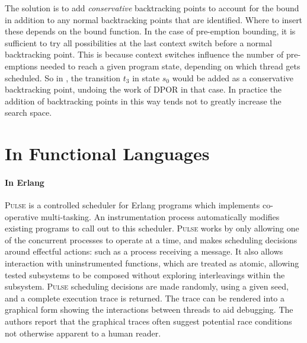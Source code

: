 The solution is to add \emph{conservative} backtracking points to
account for the bound in addition to any normal backtracking points
that are identified.  Where to insert these depends on the bound
function.  In the case of pre-emption bounding, it is sufficient to
try all possibilities at the last context switch before a normal
backtracking point\cite{coons2013}.  This is because context switches
influence the number of pre-emptions needed to reach a given program
state, depending on which thread gets scheduled.  So in
, the transition $t_3$ in state $s_0$ would be
added as a conservative backtracking point, undoing the work of DPOR
in that case.  In practice the addition of backtracking points in this
way tends not to greatly increase the search space\cite{coons2013}.

\section{In Functional Languages}
\label{sec:sct-functional}

\paragraph{In Erlang}
\textsc{Pulse}\cite{claessen2009} is a controlled scheduler for Erlang
programs which implements co-operative multi-tasking.  An
instrumentation process automatically modifies existing programs to
call out to this scheduler.  \textsc{Pulse} works by only allowing one
of the concurrent processes to operate at a time, and makes scheduling
decisions around effectful actions: such as a process receiving a
message.  It also allows interaction with uninstrumented functions,
which are treated as atomic, allowing tested subsystems to be composed
without exploring interleavings within the subsystem.  \textsc{Pulse}
scheduling decisions are made randomly, using a given seed, and a
complete execution trace is returned.  The trace can be rendered into
a graphical form showing the interactions between threads to aid
debugging.  The authors report that the graphical traces often suggest
potential race conditions not otherwise apparent to a human reader.

